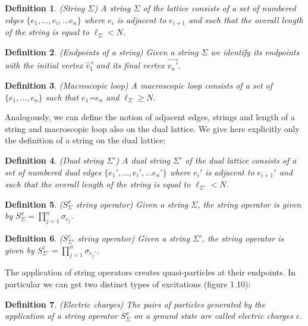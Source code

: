 \documentclass{Configuration_Files/PoliMi3i_thesis}
\newtheorem{definition}{Definition}[chapter]
\begin{document}
\begin{definition}(String $\Sigma$)
	A string $\Sigma$ of the lattice consists of a set of numbered edges $\{e_1, \dots, e_i, \dots e_n\}$ where $e_i$ is adjacent to $e_{i+1}$ and such that the overall length of the string is equal to $\ell_\Sigma < N$.
\end{definition}

\begin{definition}(Endpoints of a string)
	Given a string $\Sigma$ we identify its endpoints with the initial vertex $\vec{v_1}$ and its final vertex $\vec{v_n'}$.
\end{definition}

\begin{definition}(Macroscopic loop)
	A macroscopic loop consists of a set of $\{e_1, \dots, e_n\}$ such that $e_1$=$e_n$ and $\ell_\Sigma \ge N$.
\end{definition}

Analogously, we can define the notion of adjacent edges, strings and length of a string and macroscopic loop also on the dual lattice. We give here explicitly only the definition of a string on the dual lattice:

\begin{definition}(Dual string ${\Sigma'}$)
	A dual string ${\Sigma'}$ of the dual lattice consists of a set of numbered dual edges $\{e_1', \dots, e_i', \dots e_n'\}$ where $e_i'$ is adjacent to $e_{i+1}'$ and such that the overall length of the string is equal to $\ell_{\Sigma' }< N$.
\end{definition}


\begin{definition}($S^x_\Sigma$ string operator)
	Given a string $\Sigma$, the string operator is given by $S_\Sigma^x = \prod_{j=1}^{n}\sigma_{e_j}$.
\end{definition}

\begin{definition}($S^z_{\Sigma'}$ string operator)
	Given a string $\Sigma'$, the string operator is given by $S^z_{\Sigma'} = \prod_{j=1}^{n}\sigma_{e_j'}$.
\end{definition}

The application of string operators creates quasi-particles at their endpoints. In particular we can get two distinct types of excitations (figure 1.10):

\begin{definition}(Electric charges)
	The pairs of particles generated by the application of a string operator $S^x_\Sigma$ on a ground state are called electric charges $\epsilon$.
\end{definition}
\end{document}
